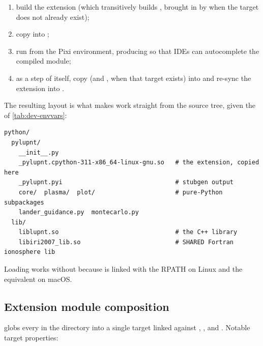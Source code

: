 \begin{enumerate}[leftmargin=1.6em]
  \item build the  extension (which transitively builds
    , brought in by
     when the target does
    not already exist);
  \item copy  into ;
  \item run  from the Pixi
    environment, producing  so that IDEs can
    autocomplete the compiled module;
  \item as a  step of  itself, copy
     (and , when that target exists) into
     and re-sync the extension into .
\end{enumerate}

The resulting layout is what makes  work straight from the
source tree, given the  of \cref{tab:dev-envvars}:

\begin{lstlisting}[language=shell]
python/
  pylupnt/
    __init__.py
    _pylupnt.cpython-311-x86_64-linux-gnu.so   # the extension, copied here
    _pylupnt.pyi                               # stubgen output
    core/  plasma/  plot/                      # pure-Python subpackages
    lander_guidance.py  montecarlo.py
  lib/
    liblupnt.so                                # the C++ library
    libiri2007_lib.so                          # SHARED Fortran ionosphere lib
\end{lstlisting}

Loading works without  because  is
linked with the RPATH  on
Linux and the  equivalent on macOS.

\subsection{Extension module composition}

 globs every  in the directory
into a single  target linked
against , , and .
Notable target properties:

